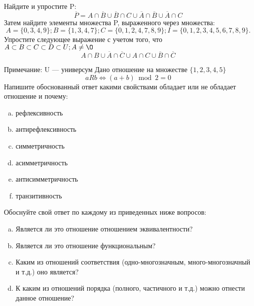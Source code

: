 \documentclass[10pt]{exam}
\begin{document}
\begin{questions}
\question
Найдите и упростите P:
\begin{equation*}
\overline{P} = A \cap \overline{B} \cup \overline{B} \cap C \cup \overline{A} \cap \overline{B} \cup \overline{A} \cap C
\end{equation*}
Затем найдите элементы множества P, выраженного через множества:
\begin{equation*}
A = \{0, 3, 4, 9\}; 
B = \{1, 3, 4, 7\};
C = \{0, 1, 2, 4, 7, 8, 9\};
I = \{0, 1, 2, 3, 4, 5, 6, 7, 8, 9\}.
\end{equation*}\question
Упростите следующее выражение с учетом того, что $A\subset B \subset C \subset D \subset U; A \neq \O$
\begin{equation*}
A \cap B \cup \overline{A} \cap \overline{C} \cup A \cap C \cup \overline{B} \cap \overline{C}
\end{equation*}

Примечание: U — универсум\question
Дано отношение на множестве $\{1, 2, 3, 4, 5\}$ 
\begin{equation*}
aRb \iff (a+b) \bmod 2 =0
\end{equation*}
Напишите обоснованный ответ какими свойствами обладает или не обладает отношение и почему:   
\begin{enumerate} [a)]\setcounter{enumi}{0}
\item рефлексивность
\item антирефлексивность
\item симметричность
\item асимметричность
\item антисимметричность
\item транзитивность
\end{enumerate}

Обоснуйте свой ответ по каждому из приведенных ниже вопросов:
\begin{enumerate} [a)]\setcounter{enumi}{0}
    \item Является ли это отношение отношением эквивалентности?
    \item Является ли это отношение функциональным?
    \item Каким из отношений соответствия (одно-многозначным, много-многозначный и т.д.) оно является?
    \item К каким из отношений порядка (полного, частичного и т.д.) можно отнести данное отношение?
\end{enumerate}




\end{questions}
\end{document}
